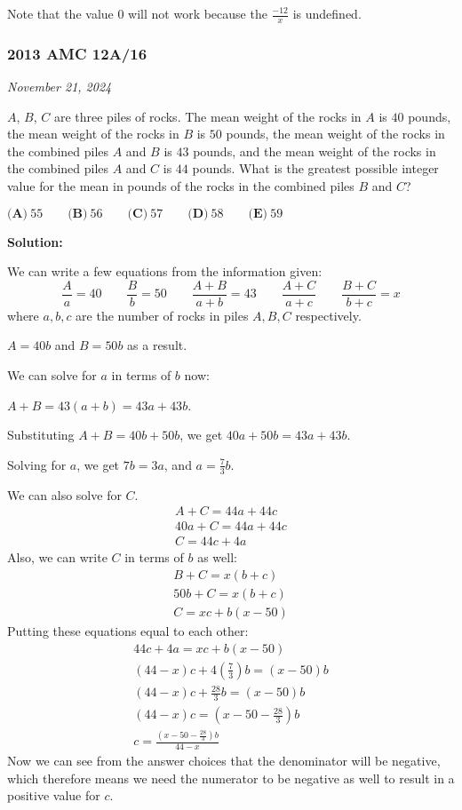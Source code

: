 \documentclass[../mathproblems.tex]{subfiles}
\begin{document}
Note that the value $0$ will not work because the $\frac{-12}{x}$ is undefined. 

\noindent\hrulefill
\subsubsection*{2013 AMC 12A/16} 
\textit{November 21, 2024}

$A$, $B$, $C$ are three piles of rocks. The mean weight of the rocks in $A$ is $40$ pounds, the mean weight of the rocks in $B$ is $50$ pounds, the mean weight of the rocks in the combined piles $A$ and $B$ is $43$ pounds, and the mean weight of the rocks in the combined piles $A$ and $C$ is $44$ pounds. What is the greatest possible integer value for the mean in pounds of the rocks in the combined piles $B$ and $C$?

$\textbf{(A)} \ 55 \qquad \textbf{(B)} \ 56 \qquad \textbf{(C)} \ 57 \qquad \textbf{(D)} \ 58 \qquad \textbf{(E)} \ 59$

\textbf{Solution:}

We can write a few equations from the information given:
\[\frac{A}{a}=40 \qquad \frac{B}{b} = 50 \qquad \frac{A+B}{a+b} = 43 \qquad \frac{A+C}{a+c} \qquad \frac{B+C}{b+c} = x\]where $a,b,c$ are the number of rocks in piles $A,B,C$ respectively.

$A=40b$ and $B=50b$ as a result.

We can solve for $a$ in terms of $b$ now:

$A+B=43(a+b) = 43a + 43b$.

Substituting $A+B=40b+50b$, we get $40a+50b=43a+43b$.

Solving for $a$, we get $7b=3a$, and $a=\frac{7}{3}b$.

We can also solve for $C$.
\begin{align*} A+C=44a+44c\\ 40a+C = 44a+44c\\ C = 44c+4a \end{align*}
Also, we can write $C$ in terms of $b$ as well:
\begin{align*} B+C=x(b+c)\\ 50b+C=x(b+c)\\ C = xc+b(x-50) \end{align*}
Putting these equations equal to each other:
\begin{align*} 44c+4a=xc+b(x-50)\\ (44-x)c+4\left(\frac{7}{3}\right)b=(x-50)b\\ (44-x)c+\frac{28}{3}b=(x-50)b\\ (44-x)c=\left(x-50-\frac{28}{3}\right)b\\ c = \frac{\left(x-50-\frac{28}{3}\right)b}{44-x} \end{align*}
Now we can see from the answer choices that the denominator will be negative, which therefore means we need the numerator to be negative as well to result in a positive value for $c$.
\end{document}

